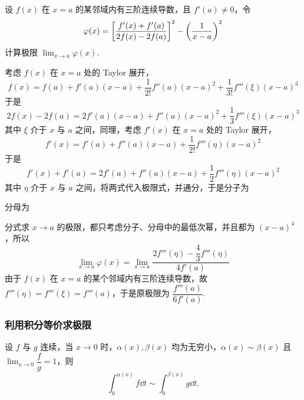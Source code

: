\begin{example}
    设 $f(x)$ 在 $x=a$ 的某邻域内有三阶连续导数，且 $f'(a)\neq0$，令 $$\varphi(x)=\qty[\dfrac{f'(x)+f'(a)}{2f(x)-2f(a)}]^2-\qty(\dfrac{1}{x-a})^2$$
    计算极限 $\displaystyle\lim_{x\to a}\varphi(x).$
\end{example}
\begin{solution}
    考虑 $f(x)$ 在 $x=a$ 处的 Taylor 展开，$$f(x)=f(a)+f'(a)(x-a)+\dfrac{1}{2!}f''(a)(x-a)^2+\dfrac{1}{3!}f'''(\xi)(x-a)^3$$
    于是 $$2f(x)-2f(a)=2f'(a)(x-a)+f''(a)(x-a)^2+\dfrac{1}{3}f'''(\xi)(x-a)^3$$
    其中 $\xi$ 介于 $x$ 与 $a$ 之间，同理，考虑 $f'(x)$ 在 $x=a$ 处的 Taylor 展开，$$f'(x)=f'(a)+f''(a)(x-a)+\dfrac{1}{2!}f'''(\eta)(x-a)^2$$
    于是 $$f'(x)+f'(a)=2f'(a)+f''(a)(x-a)+\dfrac{1}{2}f'''(\eta)(x-a)^2$$
    其中 $\eta$ 介于 $x$ 与 $a$ 之间，将两式代入极限式，并通分，于是分子为
    分母为
    分式求 $x\to a$ 的极限，都只考虑分子、分母中的最低次幂，并且都为 $(x-a)^4$，所以
    $$\lim_{x\to a}\varphi(x)=\lim_{x\to a}\dfrac{2f'''(\eta)-\dfrac{4}{3}f'''(\eta)}{4f'(a)}$$
    由于 $f(x)$ 在 $x=a$ 的某个邻域内有三阶连续导数，故 $f'''(\eta)=f'''(\xi)=f'''(a)$，于是原极限为 $\dfrac{f'''(a)}{6f'(a)}.$
\end{solution}

\subsubsection{利用积分等价求极限}

\begin{theorem}[等价积分]
    \label{fgintintsimsim}
    设 $f$ 与 $g$ 连续，当 $x\to0$ 时，$\alpha(x),\beta(x)$ 均为无穷小，$\alpha(x)\sim\beta(x)$ 且 $\displaystyle\lim_{x\to0}\dfrac{f}{g}=1$，则
    $$\int_{0}^{\alpha(x)}f\dd t\sim\int_{0}^{\beta(x)}g\dd t.$$
\end{theorem}

